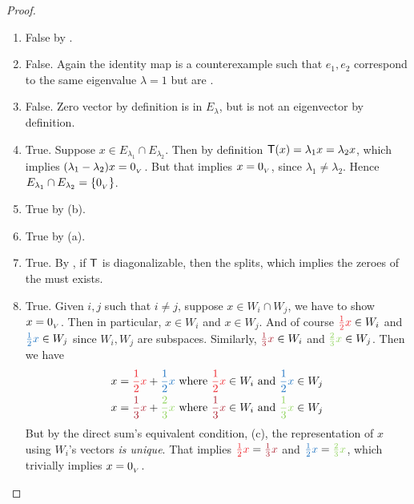 \begin{proof} \ 

\begin{enumerate}
\item False by .
\item False. Again the identity map is a counterexample such that \(e_1, e_2\) correspond to the same eigenvalue \(\lambda = 1\) but are \LID{}.
\item False. Zero vector by definition is in \(E_{\lambda}\), but is not an eigenvector by definition.

\item True.
Suppose \(x \in E_{\lambda_1} \cap E_{\lambda_2}\).
Then by definition \(\textsf{T}(x) = \lambda_1 x = \lambda_2 x\), which implies \((\lambda_1 - \lambda_2) x = 0_{_V}\).
But that implies \(x = 0_{_V}\), since \(\lambda_1 \ne \lambda_2\).
Hence \(E_{\lambda_1} \cap E_{\lambda_2} = \{ 0_{_V} \}\).

\item True by (b).
\item True by (a).
\item True.
By , if \(\textsf{T}\) is diagonalizable, then the \CPOLY{} splits, which implies the zeroes of the \CPOLY{} must exists.

\item True.
Given \(i, j\) such that \(i \ne j\), suppose \(x \in W_i \cap W_j\), we have to show \(x = 0_{_V}\).
Then in particular, \(x \in W_i\) and \(x \in W_j\).
And of course \(\RED{\frac{1}{2}x} \in W_i\) and \(\BLUE{\frac{1}{2}x} \in W_j\) since \(W_i, W_j\) are subspaces.
Similarly, \(\MAROON{\frac{1}{3}x} \in W_i\) and \(\GREEN{\frac{2}{3}x} \in W_j\).
Then we have
\begin{align*}
    x & = \RED{\frac{1}{2}x} + \BLUE{\frac{1}{2}x} \text{ where } \RED{\frac{1}{2}x} \in W_i \text{ and } \BLUE{\frac{1}{2}x} \in W_j \\
    x & = \MAROON{\frac{1}{3}x} + \GREEN{\frac{2}{3}x} \text{ where } \MAROON{\frac{1}{3}x} \in W_i \text{ and } \GREEN{\frac{1}{3}x} \in W_j
\end{align*}
But by the direct sum's equivalent condition, (c), the representation of \(x\) using \(W_i\)'s vectors \emph{is unique}.
That implies \(\RED{\frac{1}{2}x} = \MAROON{\frac{1}{3}x}\) and \(\BLUE{\frac{1}{2}x} = \GREEN{\frac{2}{3}x}\), which trivially implies \(x = 0_{_V}\).


\end{enumerate}
\end{proof}
